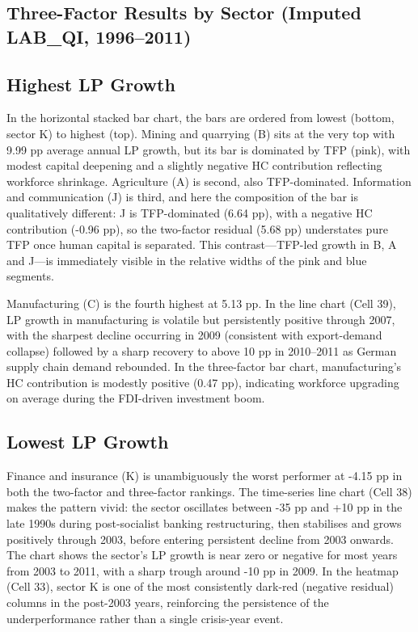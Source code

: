 \documentclass[11pt]{article}
\begin{document}
\begin{center}

\end{center}

\subsection{Three-Factor Results by Sector (Imputed LAB\_QI, 1996–2011)}

\begin{center}

\end{center}

\subsection{Highest LP Growth}

In the horizontal stacked bar chart, the bars are ordered from lowest (bottom, sector K) to highest (top). Mining and quarrying (B) sits at the very top with 9.99 pp average annual LP growth, but its bar is dominated by TFP (pink), with modest capital deepening and a slightly negative HC contribution reflecting workforce shrinkage. Agriculture (A) is second, also TFP-dominated. Information and communication (J) is third, and here the composition of the bar is qualitatively different: J is TFP-dominated (6.64 pp), with a negative HC contribution (-0.96 pp), so the two-factor residual (5.68 pp) understates pure TFP once human capital is separated. This contrast—TFP-led growth in B, A and J—is immediately visible in the relative widths of the pink and blue segments.

Manufacturing (C) is the fourth highest at 5.13 pp. In the line chart (Cell 39), LP growth in manufacturing is volatile but persistently positive through 2007, with the sharpest decline occurring in 2009 (consistent with export-demand collapse) followed by a sharp recovery to above 10 pp in 2010–2011 as German supply chain demand rebounded. In the three-factor bar chart, manufacturing’s HC contribution is modestly positive (0.47 pp), indicating workforce upgrading on average during the FDI-driven investment boom.

\subsection{Lowest LP Growth}

Finance and insurance (K) is unambiguously the worst performer at -4.15 pp in both the two-factor and three-factor rankings. The time-series line chart (Cell 38) makes the pattern vivid: the sector oscillates between -35 pp and +10 pp in the late 1990s during post-socialist banking restructuring, then stabilises and grows positively through 2003, before entering persistent decline from 2003 onwards. The chart shows the sector’s LP growth is near zero or negative for most years from 2003 to 2011, with a sharp trough around -10 pp in 2009. In the heatmap (Cell 33), sector K is one of the most consistently dark-red (negative residual) columns in the post-2003 years, reinforcing the persistence of the underperformance rather than a single crisis-year event.
\end{document}
